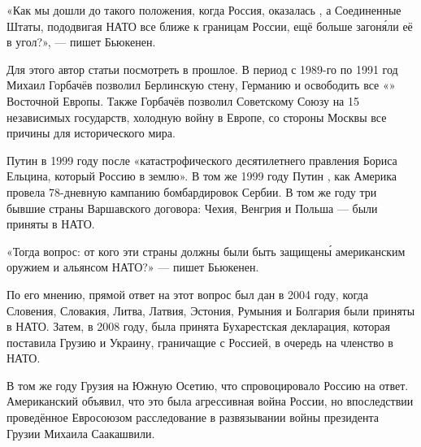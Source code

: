 \begin{fancyquotes}
    «Как мы дошли до такого положения, когда Россия, оказалась  , а Соединенные Штаты, пододвигая НАТО все ближе к границам России, ещё больше загон\'{я}ли её в угол?», --- пишет Бьюкенен.
\end{fancyquotes}

Для этого автор статьи  посмотреть в прошлое. В период с 1989-го по 1991 год Михаил Горбачёв позволил  Берлинскую стену,  Германию и освободить все «» Восточной Европы. Также Горбачёв позволил Советскому Союзу  на 15 независимых государств,  холодную войну в Европе,  со стороны Москвы все причины для исторического  мира.

Путин  в 1999 году после «катастрофического десятилетнего правления Бориса Ельцина, который   Россию в землю». В том же 1999 году Путин , как Америка провела 78-дневную кампанию бомбардировок Сербии. В том же году три бывшие страны Варшавского договора: Чехия, Венгрия и Польша --- были приняты в НАТО.

\begin{fancyquotes}
    «Тогда   вопрос: от кого эти страны должны были быть защищен\'{ы} американским оружием и альянсом НАТО?» --- пишет Бьюкенен.
\end{fancyquotes}

По его мнению, прямой ответ на этот вопрос был дан в 2004 году, когда Словения, Словакия, Литва, Латвия, Эстония, Румыния и Болгария были приняты в НАТО. Затем, в 2008 году, была принята Бухарестская декларация, которая поставила Грузию и Украину, граничащие с Россией, в очередь на членство в НАТО.

В том же году Грузия  на Южную Осетию, что спровоцировало Россию на ответ. Американский  объявил, что это была агрессивная война России, но впоследствии проведённое Евросоюзом расследование  в развязывании войны президента Грузии Михаила Саакашвили.

